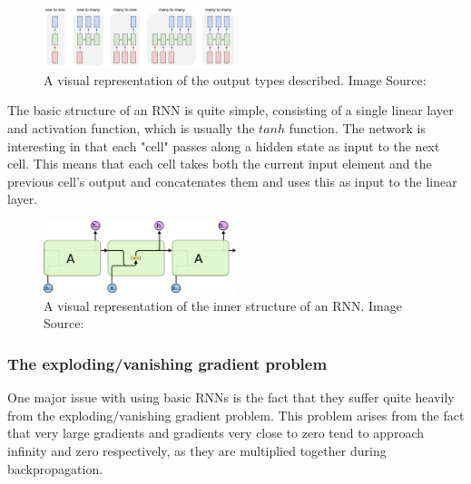 \begin{figure}[h]
	\centering
		\includegraphics[width=0.5\textwidth]{latex/imgs/rnn_types.png}
  	\caption{A visual representation of the output types described. Image Source:\cite{rnn}}
\end{figure}

The basic structure of an RNN is quite simple, consisting of a single linear layer and activation function, which is usually the $tanh$ function. The network is interesting in that each "cell" passes along a hidden state as input to the next cell. This means that each cell takes both the current input element and the previous cell's output and concatenates them and uses this as input to the linear layer.

\begin{figure}[h]
	\centering
		\includegraphics[width=0.5\textwidth]{latex/imgs/rnn.png}
  	\caption{A visual representation of the inner structure of an RNN. Image Source:\cite{rnn}}
\end{figure}

\subsubsection{The exploding/vanishing gradient problem}
One major issue with using basic RNNs is the fact that they suffer quite heavily from the exploding/vanishing gradient problem. This problem arises from the fact that very large gradients and gradients very close to zero tend to approach infinity and zero respectively, as they are multiplied together during backpropagation.

